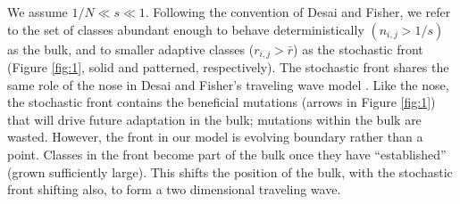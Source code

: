 \documentclass[9pt,twocolumn,twoside]{gsajnl}
\begin{document}
We assume $1/N \ll s \ll 1$.  Following the convention of Desai and Fisher, we refer to the set of classes abundant enough to behave deterministically $(n_{i,j}>1/s)$ as the bulk, and to smaller adaptive classes ($r_{i,j}>\bar{r}$) as the stochastic front (Figure \ref{fig:1}, solid and patterned, respectively). The stochastic front shares the same role of the nose in Desai and Fisher's traveling wave model \cite{desai2007beneficial}. Like the nose, the stochastic front contains the beneficial mutations (arrows in Figure \ref{fig:1}) that will drive future adaptation in the bulk; mutations within the bulk are wasted. However, the front in our model is evolving boundary rather than a point. Classes in the front become part of the bulk once they have ``established'' (grown sufficiently large). This shifts the position of  the bulk, with the stochastic front shifting also, to form a two dimensional traveling wave. \par 
% 
% 
% 
% 
\end{document}
